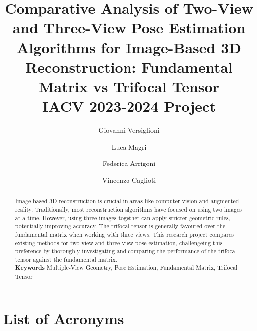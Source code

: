 \documentclass[11pt,letterpaper]{article}
\numberwithin{equation}{section}
\begin{document}
\title{Comparative Analysis of Two-View and Three-View Pose Estimation Algorithms for Image-Based 3D Reconstruction: Fundamental Matrix vs Trifocal Tensor \\ IACV 2023-2024 Project}

\author[1]{Giovanni Versiglioni}
\author[2]{Luca Magri}
\author[2]{Federica Arrigoni}
\author[2]{Vincenzo Caglioti}

\maketitle

\begin{abstract}
	Image-based 3D reconstruction is crucial in areas like computer vision and augmented reality. Traditionally, most reconstruction algorithms have focused on using two images at a time. However, using three images together can apply stricter geometric rules, potentially improving accuracy. The trifocal tensor is generally favoured over the fundamental matrix when working with three views. This research project compares existing methods for two-view and three-view pose estimation, challengeing this preference by thoroughly investigating and comparing the performance of the trifocal tensor against the fundamental matrix.\\
	
	\textbf{Keywords} Multiple-View Geometry, Pose Estimation, Fundamental Matrix, Trifocal Tensor
\end{abstract}

\begin{multicols}{2}
\tableofcontents
\end{multicols}

\pagebreak

\listoffigures

\vspace{10mm}

\listoftables

\vspace{10mm}

\listofalgorithms

\pagebreak

\section*{List of Acronyms}
\begin{acronym}
\end{acronym}
\end{document}
